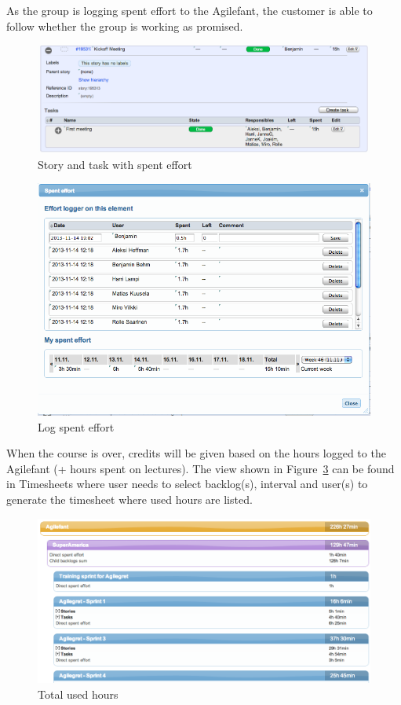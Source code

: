 As the group is logging spent effort to the Agilefant, the customer is able to follow whether the group is working as promised. 

\begin{figure}[H]
\centering
\includegraphics[width=1\textwidth]{imgs/spenteffort1.png}
\caption{Story and task with spent effort}
\label{fig:spenteffort1}
\end{figure}


\begin{figure}[H]
\centering
\includegraphics[width=1\textwidth]{imgs/spenteffort2.png}
\caption{Log spent effort}
\label{fig:spenteffort2}
\end{figure}

When the course is over, credits will be given based on the hours logged to the 
Agilefant (+ hours spent on lectures). The view shown in 
Figure~\ref{fig:totalhours} can be found in Timesheets where user needs to 
select backlog(s), interval and user(s) to generate the timesheet where used 
hours are listed.

\begin{figure}[H]
\centering
\includegraphics[width=1\textwidth]{imgs/totalhours.png}
\caption{Total used hours}
\label{fig:totalhours}
\end{figure}

